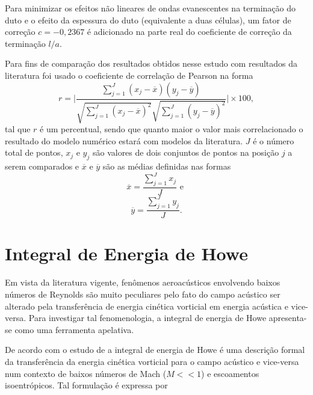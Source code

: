  Para minimizar os efeitos não lineares de ondas evanescentes na terminação do duto e o efeito da espessura do duto (equivalente a duas células), um fator de correção $c = - 0,2367$ é adicionado na parte real do coeficiente de correção da terminação $l/a$.

Para fins de comparação dos resultados obtidos nesse estudo com resultados da literatura foi usado o coeficiente de correlação de Pearson na forma
\begin{equation}
  r = \Bigg|\frac{\sum_{j=1}^{J} (x_{j} - \overline{x})(y_{j} - \overline{y})}{\sqrt{\sum_{j=1}^{J} (x_{j} - \overline{x})^{2}} \sqrt{\sum_{j=1}^{J} (y_{j} - \overline{y})^{2}}}\Bigg| \times 100,
  \label{eq:correlacao}
\end{equation}
tal que $r$ é um percentual, sendo que quanto maior o valor mais correlacionado o resultado do modelo numérico estará com modelos da literatura. $J$ é o número total de pontos, $x_{j}$ e $y_{j}$ são valores de dois conjuntos de pontos na posição $j$ a serem comparados e $\overline{x}$ e $\overline{y}$ são as médias definidas nas formas
\begin{equation}
  \overline{x} = \frac{\sum_{j=1}^{J} x_{j}}{J} \text{ e }
\end{equation}
\begin{equation}
  \overline{y} = \frac{\sum_{j=1}^{J} y_{j}}{J}. 
\end{equation}

\section{Integral de Energia de Howe}

Em vista da literatura vigente, fenômenos aeroacústicos envolvendo baixos números de Reynolds são muito peculiares pelo fato do campo acústico ser alterado pela transferência de energia cinética vorticial em energia acústica e vice-versa. Para investigar tal fenomenologia, a integral de energia de Howe apresenta-se como uma ferramenta apelativa.

De acordo com o estudo de  a integral de energia de Howe é uma descrição formal da transferência da energia cinética vorticial para o campo acústico e vice-versa num contexto de baixos números de Mach ($M << 1$) e escoamentos isoentrópicos. Tal formulação é expressa por 

